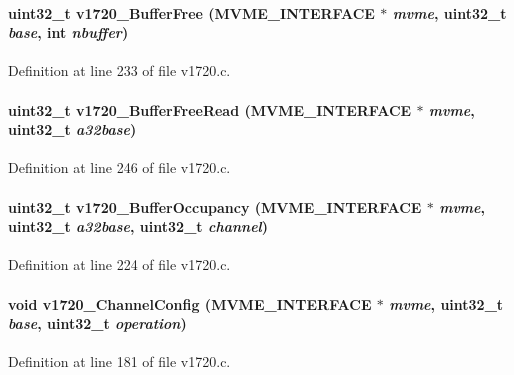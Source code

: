 \paragraph[{v1720\_\-BufferFree}]{\setlength{\rightskip}{0pt plus 5cm}uint32\_\-t v1720\_\-BufferFree ({\bf MVME\_\-INTERFACE} $\ast$ {\em mvme}, \/  uint32\_\-t {\em base}, \/  int {\em nbuffer})}\hfill\label{v1720drv_8h_a8e195a44d8038fe0e92cc5d52ad5420a}


Definition at line 233 of file v1720.c.
\paragraph[{v1720\_\-BufferFreeRead}]{\setlength{\rightskip}{0pt plus 5cm}uint32\_\-t v1720\_\-BufferFreeRead ({\bf MVME\_\-INTERFACE} $\ast$ {\em mvme}, \/  uint32\_\-t {\em a32base})}\hfill\label{v1720drv_8h_a89a6d199cfad1b665b34f27950a8eb15}


Definition at line 246 of file v1720.c.
\paragraph[{v1720\_\-BufferOccupancy}]{\setlength{\rightskip}{0pt plus 5cm}uint32\_\-t v1720\_\-BufferOccupancy ({\bf MVME\_\-INTERFACE} $\ast$ {\em mvme}, \/  uint32\_\-t {\em a32base}, \/  uint32\_\-t {\em channel})}\hfill\label{v1720drv_8h_a8aaddd86bb93f804c5f7d3282fc9d360}


Definition at line 224 of file v1720.c.
\paragraph[{v1720\_\-ChannelConfig}]{\setlength{\rightskip}{0pt plus 5cm}void v1720\_\-ChannelConfig ({\bf MVME\_\-INTERFACE} $\ast$ {\em mvme}, \/  uint32\_\-t {\em base}, \/  uint32\_\-t {\em operation})}\hfill\label{v1720drv_8h_a37472870e9201758095f83eba3feb99b}


Definition at line 181 of file v1720.c.
